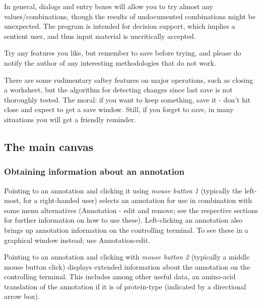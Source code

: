 In general, dialogs and entry boxes will allow you to try almost any
values/combinations, though the results of undocumented combinations
might be unexpected. The program is intended for decision support, which implies
a sentient user, and thus input material is uncritically accepted.

Try any features you like, but remember to save before trying, and please
do notify the author of any interesting methodologies that do not work.

There are some rudimentary saftey features on major operations, such
as closing a worksheet, but the algorithm for detecting changes since
last save is not thoroughly tested. The moral: if you want to keep
something, save it - don't hit close and expect to get a save
window. Still, if you forget to save, in many situations you will get
a friendly reminder.

\subsection{The main canvas}
\subsubsection{Obtaining information about an annotation}

Pointing to an annotation and clicking it using \emph{mouse button 1}
(typically the left-most, for a right-handed user) selects an
annotation for use in combination with some menu alternatives
(Annotation - edit and remove; see the respective sections for further
information on how to use these). Left-clicking an annotation also
brings up annotation information on the controlling terminal. To see
these in a graphical window instead; use Annotation-edit.

Pointing to an annotation and clicking with \emph{mouse button 2}
(typically a middle mouse button click) displays extended information
about the annotation on the controlling terminal. This includes among
other useful data, an amino-acid translation of the annotation if it
is of protein-type (indicated by a directional arrow box).

